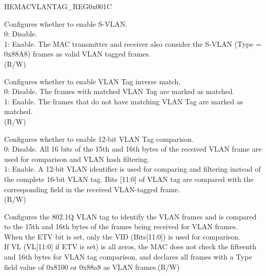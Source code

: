 \begin{register}{H}{EMACVLANTAG\_REG}{0x001C}\label{regdesc:EMACVLANTAGREG}
%
%
%
%
%
\regnewline%
\begin{regdesc}\begin{reglist}
\item [ESVL] Configures whether to enable S-VLAN.\\
0: Disable.\\
1: Enable. The MAC transmitter and receiver also consider the S-VLAN (Type = 0x88A8) frames as valid VLAN tagged frames.\\(R/W)
\item [VTIM] Configures whether to enable VLAN Tag inverse match.\\
0: Disable. The frames with matched VLAN Tag are marked as matched.\\
1: Enable. The frames that do not have matching VLAN Tag are marked as matched.\\ (R/W)
\item [ETV] Configures whether to enable 12-bit VLAN Tag comparison.\\
0: Disable. All 16 bits of the 15th and 16th bytes of the received VLAN frame are used for comparison and VLAN hash filtering.\\
1: Enable. A 12-bit VLAN identifier is used for comparing and filtering instead of the complete 16-bit VLAN tag. Bits [11:0] of VLAN tag are compared with the corresponding field in the received VLAN-tagged frame.\\(R/W)
\item [VL] Configures the 802.1Q VLAN tag to identify the VLAN frames and is compared to the 15th and 16th bytes of the frames being received for VLAN frames.\\
When the ETV bit is set, only the VID (Bits[11:0]) is used for comparison. \\
If VL (VL[11:0] if ETV is set) is all zeros, the MAC does not check the fifteenth and 16th bytes for VLAN tag comparison, and declares all frames with a Type field value of 0x8100 or 0x88a8 as VLAN frames.(R/W)
\end{reglist}\end{regdesc}
\end{register}


